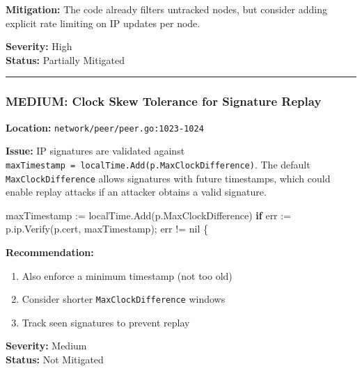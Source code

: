 \documentclass[
]{article}
\newenvironment{Shaded}{}{}
\newcommand{\ControlFlowTok}[1]{\textcolor[rgb]{0.00,0.44,0.13}{\textbf{#1}}}
\newcommand{\NormalTok}[1]{#1}
\newcommand{\OperatorTok}[1]{\textcolor[rgb]{0.40,0.40,0.40}{#1}}
\newcommand{\OtherTok}[1]{\textcolor[rgb]{0.00,0.44,0.13}{#1}}
\providecommand{\tightlist}{%
  \setlength{\itemsep}{0pt}\setlength{\parskip}{0pt}}
\begin{document}
\textbf{Mitigation:} The code already filters untracked nodes, but
consider adding explicit rate limiting on IP updates per node.

\textbf{Severity:} High\\
\textbf{Status:} Partially Mitigated

\begin{center}\rule{0.5\linewidth}{0.5pt}\end{center}

\subsubsection{MEDIUM: Clock Skew Tolerance for Signature
Replay}\label{medium-clock-skew-tolerance-for-signature-replay}

\textbf{Location:} \texttt{network/peer/peer.go:1023-1024}

\textbf{Issue:} IP signatures are validated against
\texttt{maxTimestamp\ =\ localTime.Add(p.MaxClockDifference)}. The
default \texttt{MaxClockDifference} allows signatures with future
timestamps, which could enable replay attacks if an attacker obtains a
valid signature.

\begin{Shaded}
\begin{Highlighting}[]
\NormalTok{maxTimestamp }\OperatorTok{:=}\NormalTok{ localTime}\OperatorTok{.}\NormalTok{Add}\OperatorTok{(}\NormalTok{p}\OperatorTok{.}\NormalTok{MaxClockDifference}\OperatorTok{)}
\ControlFlowTok{if}\NormalTok{ err }\OperatorTok{:=}\NormalTok{ p}\OperatorTok{.}\NormalTok{ip}\OperatorTok{.}\NormalTok{Verify}\OperatorTok{(}\NormalTok{p}\OperatorTok{.}\NormalTok{cert}\OperatorTok{,}\NormalTok{ maxTimestamp}\OperatorTok{);}\NormalTok{ err }\OperatorTok{!=} \OtherTok{nil} \OperatorTok{\{}
\end{Highlighting}
\end{Shaded}

\textbf{Recommendation:}

\begin{enumerate}
\def\labelenumi{\arabic{enumi}.}
\tightlist
\item
  Also enforce a minimum timestamp (not too old)
\item
  Consider shorter \texttt{MaxClockDifference} windows
\item
  Track seen signatures to prevent replay
\end{enumerate}

\textbf{Severity:} Medium\\
\textbf{Status:} Not Mitigated
\end{document}
